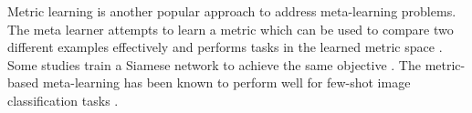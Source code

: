 \documentclass{article}
\begin{document}
Metric learning is another popular approach to address meta-learning problems. The meta learner attempts to
learn a metric which can be used to compare two different examples effectively and performs tasks in the learned metric space \cite{Vinyals:nips2016:DBLP:conf/nips/VinyalsBLKW16}. Some studies train a Siamese network to achieve the same objective \cite{Koch:icmlw2015:DBLP:conf/icml/ShyamGD17}. The metric-based meta-learning has been known to perform well for few-shot image classification tasks \cite{Snell:nips2017:DBLP:conf/nips/SnellSZ17, Shyam:icml2017:DBLP:conf/icml/ShyamGD17}.
\end{document}
